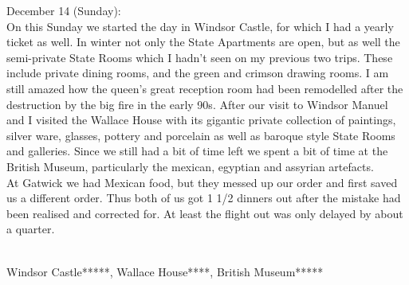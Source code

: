 December 14 (Sunday):\\
On this Sunday we started the day in Windsor Castle, for which I had a yearly ticket as well. In winter not only the State Apartments are open, but as well the semi-private State Rooms which I hadn't seen on my previous two trips. These include private dining rooms, and the green and crimson drawing rooms. I am still amazed how the queen's great reception room had been remodelled after the destruction by the big fire in the early 90s. After our visit to Windsor Manuel and I visited the Wallace House with its gigantic private collection of paintings, silver ware, glasses, pottery and porcelain as well as baroque style State Rooms and galleries. Since we still had a bit of time left we spent a bit of time at the British Museum, particularly the mexican, egyptian and assyrian artefacts.\\
At Gatwick we had Mexican food, but they messed up our order and first saved us a different order. Thus both of us got 1 1/2 dinners out after the mistake had been realised and corrected for. At least the flight out was only delayed by about a quarter.\\\

Windsor Castle*****, Wallace House****, British Museum*****